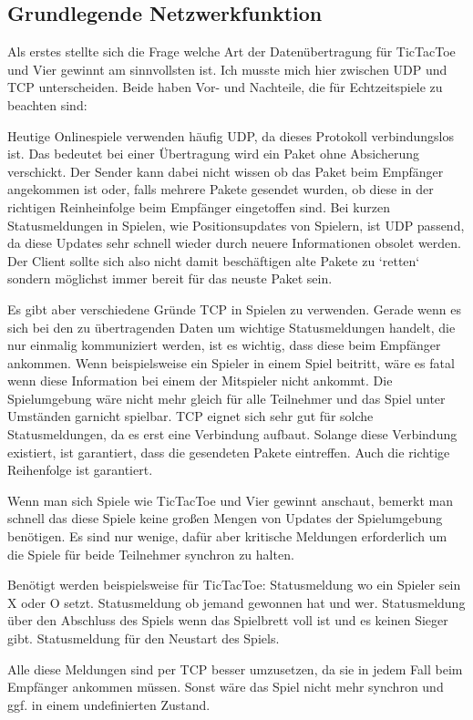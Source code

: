 \subsection{Grundlegende Netzwerkfunktion}
Als erstes stellte sich die Frage welche Art der Datenübertragung für TicTacToe und Vier gewinnt am sinnvollsten ist.
Ich musste mich hier zwischen UDP und TCP unterscheiden. Beide haben Vor- und Nachteile, die für Echtzeitspiele zu beachten sind:
\par
Heutige Onlinespiele verwenden häufig UDP, da dieses Protokoll verbindungslos ist.
Das bedeutet bei einer Übertragung wird ein Paket ohne Absicherung verschickt. Der Sender kann dabei nicht wissen ob das Paket
beim Empfänger angekommen ist oder, falls mehrere Pakete gesendet wurden, ob diese in der richtigen Reinheinfolge beim Empfänger
eingetoffen sind.
Bei kurzen Statusmeldungen in Spielen, wie Positionsupdates von Spielern, ist UDP passend, da diese Updates sehr schnell wieder
durch neuere Informationen obsolet werden. Der Client sollte sich also nicht damit beschäftigen alte Pakete zu `retten` sondern
möglichst immer bereit für das neuste Paket sein.
\par
Es gibt aber verschiedene Gründe TCP in Spielen zu verwenden.
Gerade wenn es sich bei den zu übertragenden Daten um wichtige Statusmeldungen handelt, die nur einmalig kommuniziert werden,
ist es wichtig, dass diese beim Empfänger ankommen. Wenn beispielsweise ein Spieler in einem Spiel beitritt, wäre es fatal
wenn diese Information bei einem der Mitspieler nicht ankommt. Die Spielumgebung wäre nicht mehr gleich für alle Teilnehmer
und das Spiel unter Umständen garnicht spielbar. TCP eignet sich sehr gut für solche Statusmeldungen, da es erst eine Verbindung aufbaut.
Solange diese Verbindung existiert, ist garantiert, dass die gesendeten Pakete eintreffen. Auch die richtige Reihenfolge ist garantiert.
\par
Wenn man sich Spiele wie TicTacToe und Vier gewinnt anschaut, bemerkt man schnell das diese Spiele keine großen Mengen von Updates
der Spielumgebung benötigen. Es sind nur wenige, dafür aber kritische Meldungen erforderlich um die Spiele für beide Teilnehmer
synchron zu halten.
\par
Benötigt werden beispielsweise für TicTacToe:
\newline
Statusmeldung wo ein Spieler sein X oder O setzt.
\newline
Statusmeldung ob jemand gewonnen hat und wer.
\newline
Statusmeldung über den Abschluss des Spiels wenn das Spielbrett voll ist und es keinen Sieger gibt.
\newline
Statusmeldung für den Neustart des Spiels.
\par
Alle diese Meldungen sind per TCP besser umzusetzen, da sie in jedem Fall beim Empfänger ankommen müssen. Sonst wäre das Spiel
nicht mehr synchron und ggf. in einem undefinierten Zustand.
